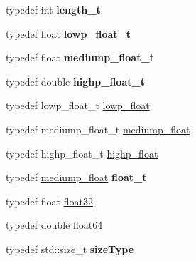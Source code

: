 \begin{DoxyCompactItemize}
\item 
\hypertarget{namespaceglm_a090a0de2260835bee80e71a702492ed9}{typedef int {\bfseries length\-\_\-t}}\label{namespaceglm_a090a0de2260835bee80e71a702492ed9}

\item 
\hypertarget{namespaceglm_a0a43b64238afac063f27ee7620205bf2}{typedef float {\bfseries lowp\-\_\-float\-\_\-t}}\label{namespaceglm_a0a43b64238afac063f27ee7620205bf2}

\item 
\hypertarget{namespaceglm_aec127979a2b6edbf05b485cb4e8c47cc}{typedef float {\bfseries mediump\-\_\-float\-\_\-t}}\label{namespaceglm_aec127979a2b6edbf05b485cb4e8c47cc}

\item 
\hypertarget{namespaceglm_af6f4e45ae06ae3f979dd30cafe7d07c6}{typedef double {\bfseries highp\-\_\-float\-\_\-t}}\label{namespaceglm_af6f4e45ae06ae3f979dd30cafe7d07c6}

\item 
typedef lowp\-\_\-float\-\_\-t \hyperlink{group__core__precision_ga2887fbc729ac5c1c5caeb7cd57a7145c}{lowp\-\_\-float}
\item 
typedef mediump\-\_\-float\-\_\-t \hyperlink{group__core__precision_gac785826c039fe6c97c03b37c81c1a68e}{mediump\-\_\-float}
\item 
typedef highp\-\_\-float\-\_\-t \hyperlink{group__core__precision_ga3d443a093adc053638ed7f81c5bfe300}{highp\-\_\-float}
\item 
\hypertarget{group__core__precision_gae01b87f81bd15327230bf1b47c482b24}{typedef \hyperlink{group__core__precision_gac785826c039fe6c97c03b37c81c1a68e}{mediump\-\_\-float} {\bfseries float\-\_\-t}}\label{group__core__precision_gae01b87f81bd15327230bf1b47c482b24}

\item 
typedef float \hyperlink{group__gtc__type__precision_ga814f2f65354b6588b067cc5c67a6b340}{float32}
\item 
typedef double \hyperlink{group__gtc__type__precision_gab721f828b41f46b20cf4883b50733d3b}{float64}
\item 
\hypertarget{namespaceglm_ae49d80f7bfe4be96585fe8f1d3431cc6}{typedef std\-::size\-\_\-t {\bfseries size\-Type}}\label{namespaceglm_ae49d80f7bfe4be96585fe8f1d3431cc6}


\end{DoxyCompactItemize}
